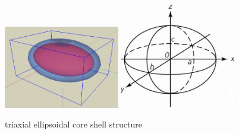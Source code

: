 \begin{figure}[htb]
\begin{center}
\includegraphics[width=0.45\textwidth]{../images/form_factor/Ellipsoid/triaxEll.png}
\hspace{0.08\textwidth}
\includegraphics[width=0.45\textwidth]{../images/form_factor/Ellipsoid/A4ellipd.png}
\end{center}
\caption{triaxial ellipsoidal core shell structure} \label{triaEllShell}
\end{figure}

